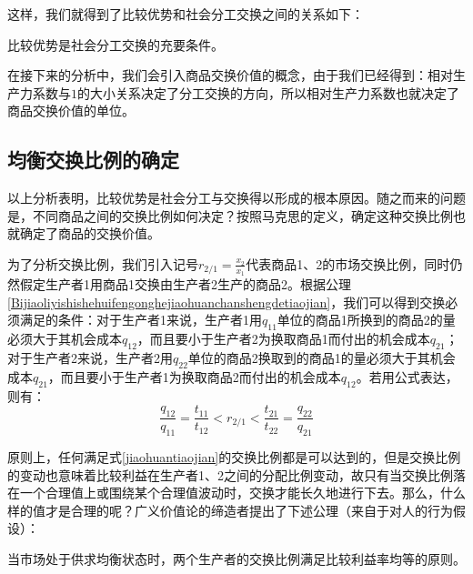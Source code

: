 这样，我们就得到了比较优势和社会分工交换之间的关系如下：

\begin{theorem}
    比较优势是社会分工交换的充要条件。
\end{theorem}

在接下来的分析中，我们会引入商品交换价值的概念，由于我们已经得到：相对生产力系数与$1$的大小关系决定了分工交换的方向，所以相对生产力系数也就决定了商品交换价值的单位。

\subsection{均衡交换比例的确定}

以上分析表明，比较优势是社会分工与交换得以形成的根本原因。随之而来的问题是，不同商品之间的交换比例如何决定？按照马克思的定义，确定这种交换比例也就确定了商品的交换价值\cite[49]{ZhongGongZhongYangMaKeSiEnGeSiLieNingSiDaLinZhuZuoBianYiJuMaKeSiEnGeSiWenJiDi5Juan2009}。

为了分析交换比例，我们引入记号$r_{2/1}=\frac{x_2}{x_1}$代表商品1、2的市场交换比例，同时仍然假定生产者1用商品1交换由生产者2生产的商品2。根据公理\ref{Bijiaoliyishishehuifengonghejiaohuanchanshengdetiaojian}，我们可以得到交换必须满足的条件：对于生产者1来说，生产者1用$q_{11}$单位的商品1所换到的商品2的量必须大于其机会成本$q_{12}$，而且要小于生产者2为换取商品1而付出的机会成本$q_{21}$；对于生产者2来说，生产者2用$q_{22}$单位的商品2换取到的商品1的量必须大于其机会成本$q_{21}$，而且要小于生产者1为换取商品2而付出的机会成本$q_{12}$\cite[64]{CaiJiMingCongXiaYiJieZhiLunDaoGuangYiJieZhiLunXiuDingBan2022}。若用公式表达，则有\cite[64]{CaiJiMingCongXiaYiJieZhiLunDaoGuangYiJieZhiLunXiuDingBan2022}：
\begin{equation}
    \label{jiaohuantiaojian}
    \frac{q_{12}}{q_{11}} = \frac{t_{11}}{t_{12}} < r_{2/1} < \frac{t_{21}}{t_{22}} = \frac{q_{22}}{q_{21}}
\end{equation}

原则上，任何满足式\ref{jiaohuantiaojian}的交换比例都是可以达到的，但是交换比例的变动也意味着比较利益在生产者1、2之间的分配比例变动，故只有当交换比例落在一个合理值上或围绕某个合理值波动时，交换才能长久地进行下去。那么，什么样的值才是合理的呢？广义价值论的缔造者提出了下述公理（来自于对人的行为假设\cite[413]{LiRenJunGuangYiJieZhiLunDeLuoJiYuZhengLun2009}）：
\begin{axiom}
    当市场处于供求均衡状态时，两个生产者的交换比例满足比较利益率均等的原则\cite[65]{CaiJiMingCongXiaYiJieZhiLunDaoGuangYiJieZhiLunXiuDingBan2022}。
\end{axiom}

